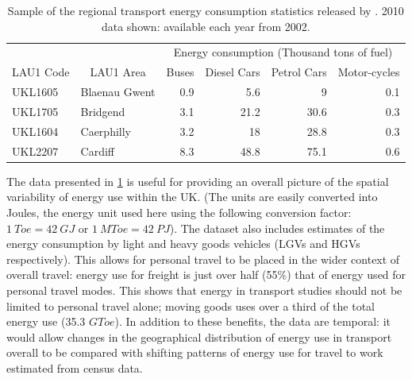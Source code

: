 \documentclass[a4paper, 11pt, twoside]{Thesis}
\begin{document}
\begin{table}[h]
\centerline{}
\caption[Sample of regional transport energy consumption statistics]
{Sample of the regional transport energy consumption statistics released by
\citet{Decc2013-regcons}. 2010 data shown: available each year from 2002.}
\begin{tabular}{llrrrr}
\toprule
\multicolumn{1}{c}{} & \multicolumn{1}{c}{} & \multicolumn{ 4}{c}{Energy consumption (Thousand tons of fuel)} \\
\cmidrule{3-6}
\multicolumn{1}{c}{LAU1 Code} & \multicolumn{1}{c}{LAU1 Area} & \multicolumn{1}{c}{Buses} & \multicolumn{1}{c}{Diesel Cars} & \multicolumn{1}{c}{Petrol Cars} & \multicolumn{1}{c}{Motor-cycles} \\
\midrule
UKL1605 & Blaenau Gwent & 0.9 & 5.6 & 9 & 0.1 \\
UKL1705 & Bridgend & 3.1 & 21.2 & 30.6 & 0.3 \\
UKL1604 & Caerphilly & 3.2 & 18 & 28.8 & 0.3 \\
UKL2207 & Cardiff & 8.3 & 48.8 & 75.1 & 0.6 \\
\bottomrule
\end{tabular}
\label{t:deccdata}
\end{table}

The data presented in \cref{t:deccdata} is useful for providing an overall
picture of the spatial variability of energy use within the UK. (The units are
easily converted into Joules, the energy unit used here using the
following conversion factor: $1~Toe = 42~GJ$ or $1~MToe = 42~PJ$). The dataset
also includes estimates of the energy consumption by light and heavy goods
vehicles (LGVs and HGVs respectively). This allows for personal travel to be
placed in the wider context of overall travel: energy use for freight is just over
half (55\%) that of energy used for personal travel modes. This shows that
energy in transport
studies should not be limited to personal travel alone; moving goods
uses over a third of the total energy use (35.3 $GToe$). In addition to these
benefits, the data are temporal: it would allow changes in the geographical
distribution of energy use in transport overall to be compared with shifting
patterns of energy use for travel to work estimated from census data.
\end{document}
